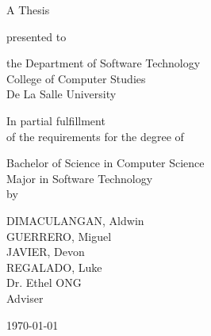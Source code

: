 %
%
%                 

\begin{titlepage}
\centering



\vspace{1.5cm}

A Thesis\\

\vspace{0.5cm}

presented to\\

\vspace{0.5cm}

the Department of Software Technology\\
College of Computer Studies\\
De La Salle University

\vspace{1cm}

In partial fulfillment\\
of the requirements for the degree of\\

\vspace{0.5cm}

Bachelor of Science in Computer Science\\
Major in Software Technology
\vspace{1.75cm}
\\by\\


\vspace{1cm}

DIMACULANGAN, Aldwin  \\
GUERRERO, Miguel  \\
JAVIER, Devon  \\
REGALADO, Luke  \\

\vspace{1.75cm}
Dr. Ethel ONG \\
Adviser

\vspace{1cm}
\today
\end{titlepage}
